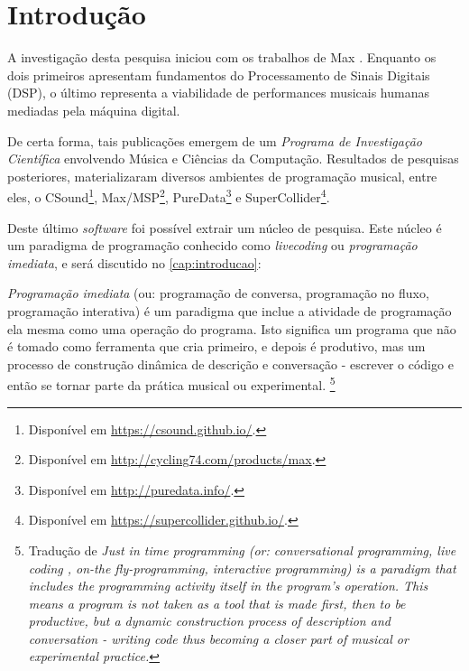 \chapter*[Introdução]{Introdução}

A investigação desta pesquisa iniciou com os trabalhos de Max . Enquanto os dois primeiros apresentam fundamentos do Processamento de Sinais Digitais (DSP), o último representa a viabilidade de performances musicais humanas mediadas pela máquina digital.

De certa forma, tais publicações emergem de um \emph{Programa de Investigação Científica} \cite{lakatos_falsification_1970,neto_lakatos_2008} envolvendo Música e Ciências da Computação. Resultados de pesquisas posteriores, materializaram diversos ambientes de programação musical, entre eles, o CSound\footnote{Disponível em \url{https://csound.github.io/}.}, Max/MSP\footnote{Disponível em \url{http://cycling74.com/products/max}.}, PureData\footnote{Disponível em \url{http://puredata.info/}.} e SuperCollider\footnote{Disponível em \url{https://supercollider.github.io/}.}.

Deste último \emph{software} foi possível extrair um núcleo de pesquisa. Este núcleo é um paradigma de programação conhecido como \emph{livecoding} ou \emph{programação imediata}, e será discutido no \autoref{cap:introducao}:

\begin{citacao}
\emph{Programação imediata} (ou: programação de conversa, programação no fluxo, programação interativa) é um paradigma que inclue a atividade de programação ela mesma como uma operação do programa. Isto significa um programa que não é tomado como ferramenta que cria primeiro, e depois é produtivo, mas um processo de construção dinâmica de descrição e conversação - escrever o código e então se tornar parte da prática musical ou experimental. \cite[Verbete JITLib]{supercollider.org_supercollider_2014}\footnote{Tradução de \emph{Just in time programming (or: conversational programming, live coding , on-the fly-programming, interactive programming) is a paradigm that includes the programming activity itself in the program's operation. This means a program is not taken as a tool that is made first, then to be productive, but a dynamic construction process of description and conversation - writing code thus becoming a closer part of musical or experimental practice.}}
\end{citacao}

